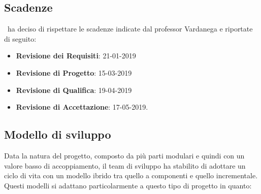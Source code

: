 	\subsection{Scadenze}
	\gruppo\ ha deciso di rispettare le scadenze indicate dal professor Vardanega e riportate di seguito:
	\begin{itemize}
		\item \textbf{Revisione dei Requisiti}: 21-01-2019
		\item \textbf{Revisione di Progetto}: 15-03-2019
		\item \textbf{Revisione di Qualifica}: 19-04-2019
		\item \textbf{Revisione di Accettazione}: 17-05-2019.
	\end{itemize}
	
	\subsection{Modello di sviluppo} %
	Data la natura del progetto, composto da più parti modulari e quindi con un valore basso di accoppiamento, il team di sviluppo ha stabilito di adottare un ciclo di vita con un modello ibrido tra quello a componenti e quello incrementale.
	Questi modelli si adattano particolarmente a questo tipo di progetto in quanto:
